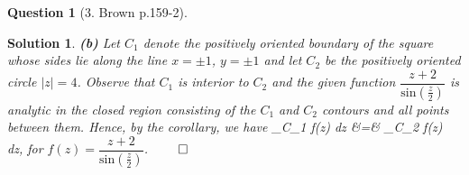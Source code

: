 \documentclass{article} %
\def\eQb#1\eQe{\begin{eqnarray*}#1\end{eqnarray*}}
\theoremstyle{quest}
\newtheorem*{question}{Question}
\newtheorem*{solution}{Solution}
\begin{document}
\bigskip

\begin{question}[3. Brown p.159-2]
\end{question}
\begin{solution}
\textbf{(b)}
Let $C_1$ denote the positively oriented boundary of the square 
whose sides lie along the line $x = \pm 1$, $y = \pm 1$ and 
let $C_2$ be the positively oriented circle $|z| = 4$. Observe that
$C_1$ is interior to $C_2$ and the given function 
$\dfrac{z+2}{\mathrm{sin}(\frac{z}{2})}$ is analytic in the closed
region consisting of the $C_1$ and $C_2$ contours and all points
between them. Hence, by the corollary, we have
\eQb
\int_{C_1} f(z) dz &=& \int_{C_2} f(z) dz,
\eQe
for $f(z) = \dfrac{z+2}{\mathrm{sin}(\frac{z}{2})}$. $\qed$
\end{solution}

\bigskip
\end{document}
